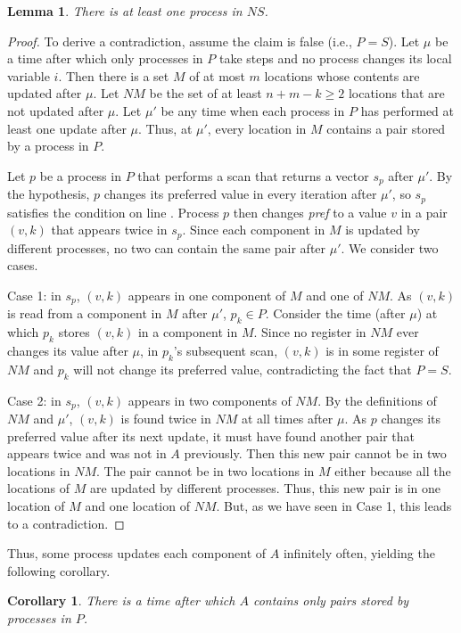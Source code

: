\documentclass[11pt]{article}
\newtheorem{corollary}[theorem]{Corollary}
\newtheorem{lemma}[theorem]{Lemma}
\newcounter{linenum}
\newcommand{\lref}[1]{\linenumref{#1}}
\begin{document}
\begin{lemma}\label{term-dontchange}
There is at least one process in $NS$.
\end{lemma}
\begin{proof}
To derive a contradiction, assume the claim is false (i.e., $P=S$).
Let $\mu$ be a time after which only processes in $P$ take steps and
no process changes its local variable $i$.
Then there is a set $M$ of at most $m$ locations whose contents are updated after $\mu$.  Let $NM$ be the set of at least $n+m-k\ge 2$ locations that are not
updated after $\mu$.
Let $\mu'$ be any time when each process in $P$ has performed at least one
update after $\mu$. Thus, at $\mu'$, every location in $M$ contains a pair stored by a process in $P$.

Let $p$ be a process in $P$ that performs a scan that returns a vector $s_p$ after $\mu'$.  
By the hypothesis, $p$ changes its preferred value in every iteration after $\mu'$, so $s_p$ satisfies the condition on line \lref{cond}.
Process $p$ then changes {\it pref} to a value $v$ in a pair $(v,k)$ 
that appears twice in $s_p$.
Since each component in $M$ is updated by different processes, no two can
contain the same pair after $\mu'$.
We consider two cases.

{\sc Case 1:}  in $s_p$, $(v,k)$ appears in one component of $M$ and one of $NM$. 
As  $(v,k)$ is read from a component in $M$ after $\mu'$, $p_k\in P$.
Consider the time (after $\mu$) at which $p_k$ stores $(v,k)$ in a
component in $M$.
Since no register in $NM$ ever changes its value after $\mu$, 
in $p_k$'s subsequent scan, $(v,k)$ is in some register of $NM$ and $p_k$ will not change its preferred value, contradicting the fact that $P=S$.

{\sc Case 2:} in $s_p$, $(v,k)$ appears in two components of $NM$.
By the definitions of $NM$ and $\mu'$,  $(v,k)$ is found twice in $NM$ at all times after $\mu$. 
As $p$ changes its preferred value after its next update, it must have found another pair that appears twice and was not in $A$ previously. 
Then this new pair cannot be in two locations in $NM$. The pair cannot  be in two locations
in $M$ either because all the locations of $M$ are updated by different processes. 
Thus, this new pair is  in one location of $M$ and one location of $NM$. But, as we have seen in
Case 1, this leads to
a contradiction.
\end{proof}
Thus, some process updates each component of $A$ infinitely often, yielding the following corollary.
\begin{corollary}\label{term-cor}
There is a time  after which $A$ contains only pairs stored by processes in $P$.
\end{corollary}
\end{document}

